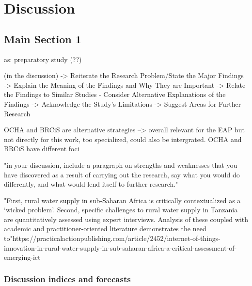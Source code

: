 
\chapter{Discussion} %

\label{Chapter5} %


\section{Main Section 1}
as: preparatory study (??)


(in the discussion)
-> Reiterate the Research Problem/State the Major Findings
-> Explain the Meaning of the Findings and Why They are Important
-> Relate the Findings to Similar Studies
- Consider Alternative Explanations of the Findings
-> Acknowledge the Study's Limitations
-> Suggest Areas for Further Research


OCHA and BRCiS are alternative strategies --> overall relevant for the EAP but not directly for this work, too specialized, could also be intergrated. OCHA and BRCiS have different foci

"in your discussion, include a paragraph on strengths and weaknesses that you have discovered as a result of carrying out the research, say what you would do differently, and what would lend itself to further research."



"First, rural water supply in sub-Saharan Africa is critically contextualized as a ‘wicked problem’. Second, specific challenges to rural water supply in Tanzania are quantitatively assessed using expert interviews. Analysis of these coupled with academic and practitioner-oriented literature demonstrates the need to"https://practicalactionpublishing.com/article/2452/internet-of-things-innovation-in-rural-water-supply-in-sub-saharan-africa-a-critical-assessment-of-emerging-ict


\subsection{Discussion indices and forecasts}

